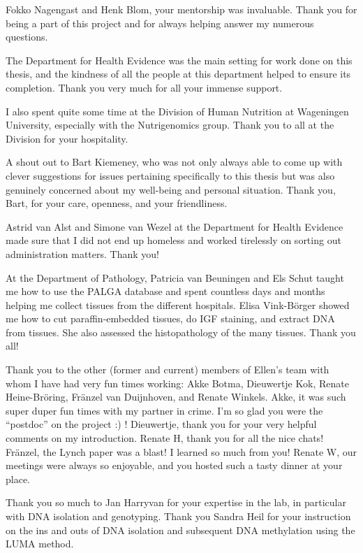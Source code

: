 \noindent Fokko Nagengast and Henk Blom, your mentorship was invaluable. Thank you for being a part of this project and for always helping answer my numerous questions.

\noindent The Department for Health Evidence was the main setting for work done on this thesis, and the kindness of all the people at this department helped to ensure its completion. Thank you very much for all your immense support.

\noindent I also spent quite some time at the Division of Human Nutrition at Wageningen University, especially with the Nutrigenomics group. Thank you to all at the Division for your hospitality.

\noindent A shout out to Bart Kiemeney, who was not only always able to come up with clever suggestions for issues pertaining specifically to this thesis but was also genuinely concerned about my well-being and personal situation. Thank you, Bart, for your care, openness, and your friendliness.

\noindent Astrid van Alst and Simone van Wezel at the Department for Health Evidence made sure that I did not end up homeless and worked tirelessly on sorting out administration matters. Thank you!

\noindent At the Department of Pathology, Patricia van Beuningen and Els Schut taught me how to use the PALGA database and spent countless days and months helping me collect tissues from the different hospitals. Elisa Vink-B{\"o}rger showed me how to cut paraffin-embedded tissues, do IGF staining, and extract DNA from tissues. She also assessed the histopathology of the many tissues. Thank you all!

\noindent Thank you to the other (former and current) members of Ellen's team with whom I have had very fun times working: Akke Botma, Dieuwertje Kok, Renate Heine-Br{\"o}ring, Fr{\"a}nzel van Duijnhoven, and Renate Winkels. Akke, it was such super duper fun times with my partner in crime. I'm so glad you were the ``postdoc'' on the project :) ! Dieuwertje, thank you for your very helpful comments on my introduction. Renate H, thank you for all the nice chats! Fr{\"a}nzel, the Lynch paper was a blast! I learned so much from you! Renate W, our meetings were always so enjoyable, and you hosted such a tasty dinner at your place.

\noindent Thank you so much to Jan Harryvan for your expertise in the lab, in particular with DNA isolation and genotyping. Thank you Sandra Heil for your instruction on the ins and outs of DNA isolation and subsequent DNA methylation using the LUMA method.

